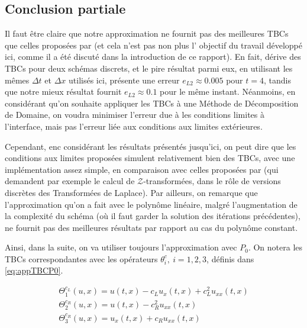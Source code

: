 \subsection{Conclusion partiale}

\indent Il faut être claire que notre approximation ne fournit pas des meilleures TBCs que celles proposées par \cite{besse2015} (et cela n'est pas non plus l' objectif du travail développé ici, comme il a été discuté dans la introduction de ce rapport). En fait, \cite{besse2015} dérive des TBCs pour deux schémas discrets, et le pire résultat parmi eux, en utilisant les mêmes $\Delta t$ et $\Delta x$ utilisés ici, présente une erreur $e_{L2} \approx 0.005$ pour $t = 4$, tandis que notre mieux résultat fournit $e_{L2} \approx 0.1$ pour le même instant. Néanmoins, en considérant qu'on souhaite appliquer les TBCs à une Méthode de Décomposition de Domaine, on voudra minimiser l'erreur due à les conditions limites à l'interface, mais pas l'erreur liée aux conditions aux limites extérieures.

\indent Cependant, enc considérant les résultats présentés jusqu'ici, on peut dire que les conditions aux limites proposées simulent relativement bien des TBCs, avec une implémentation assez simple, en comparaison avec celles proposées par \cite{besse2015} (qui demandent par exemple le calcul de $\mathcal{Z}$-transformées, dans le rôle de versions discrètes des Transformées de Laplace). Par ailleurs, on remarque que l'approximation qu'on a fait avec le polynôme linéaire, malgré l'augmentation de la complexité du schéma (où il faut garder la solution des itérations précédentes), ne fournit pas des meilleures résultats par rapport au cas du polynôme constant.

\indent Ainsi, dans la suite, on va utiliser toujours l'approximation avec $P_0$. On notera les TBCs correspondantes avec les opérateurs $\theta_i^c, \ i=1,2,3$, définis dans \eqref{eq:appTBCP0}.

\begin{equation*}
    \begin{gathered}
        \Theta_1^{c_L}(u,x) = u(t,x) - c_L u_x(t,x)  + c_L^2  u_{xx}(t,x) \\
        \Theta_2^{c_R}(u,x) =  u(t,x) - c_R^2    u_{xx}(t,x)\\
        \Theta_3^{c_R} (u,x)= u_x(t,x) + c_R u_{xx}(t,x) 
    \end{gathered}
\end{equation*}